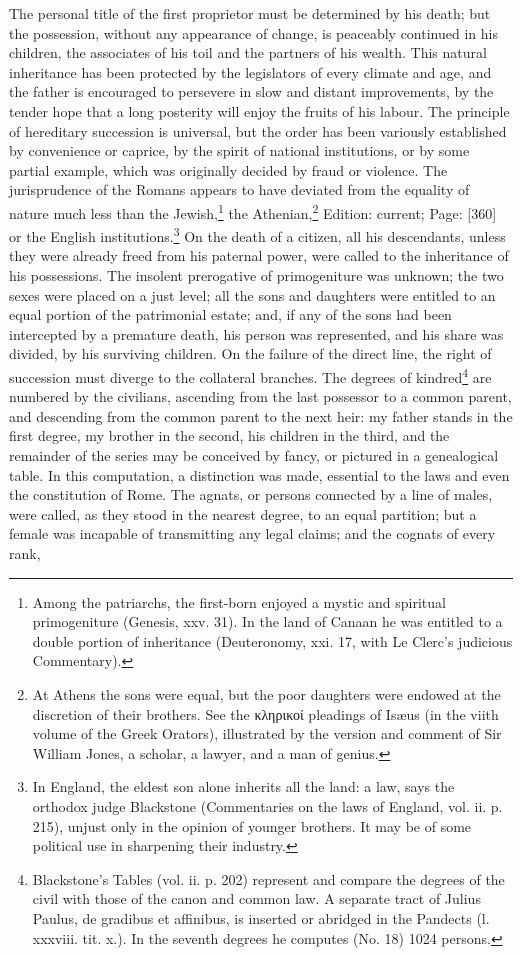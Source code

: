 The personal title of the first proprietor must be determined by his death; but the possession, without any appearance of change, is peaceably continued in his children, the associates of his toil and the partners of his wealth. This natural inheritance has been protected by the legislators of every climate and age, and the father is encouraged to persevere in slow and distant improvements, by the tender hope that a long posterity will enjoy the fruits of his labour. The principle of hereditary succession is universal, but the order has been variously established by convenience or caprice, by the spirit of national institutions, or by some partial example, which was originally decided by fraud or violence. The jurisprudence of the Romans appears to have deviated from the equality of nature much less than the Jewish,\footnote{Among the patriarchs, the first-born enjoyed a mystic and spiritual primogeniture (Genesis, xxv. 31). In the land of Canaan he was entitled to a double portion of inheritance (Deuteronomy, xxi. 17, with Le Clerc\texthebrew{}’s judicious Commentary).} the Athenian,\footnote{At Athens the sons were equal, but the poor daughters were endowed at the discretion of their brothers. See the \textgreek{κληρικοί} pleadings of Isæus (in the viith volume of the Greek Orators), illustrated by the version and comment of Sir William Jones, a scholar, a lawyer, and a man of genius.} Edition: current; Page: [360] or the English institutions.\footnote{In England, the eldest son alone inherits all the land: a law, says the orthodox judge Blackstone (Commentaries on the laws of England, vol. ii. p. 215), unjust only in the opinion of younger brothers. It may be of some political use in sharpening their industry.} On the death of a citizen, all his descendants, unless they were already freed from his paternal power, were called to the inheritance of his possessions. The insolent prerogative of primogeniture was unknown; the two sexes were placed on a just level; all the sons and daughters were entitled to an equal portion of the patrimonial estate; and, if any of the sons had been intercepted by a premature death, his person was represented, and his share was divided, by his surviving children. On the failure of the direct line, the right of succession must diverge to the collateral branches. The degrees of kindred\footnote{Blackstone\texthebrew{}’s Tables (vol. ii. p. 202) represent and compare the degrees of the civil with those of the canon and common law. A separate tract of Julius Paulus, de gradibus et affinibus, is inserted or abridged in the Pandects (l. xxxviii. tit. x.). In the seventh degrees he computes (No. 18) 1024 persons.} are numbered by the civilians, ascending from the last possessor to a common parent, and descending from the common parent to the next heir: my father stands in the first degree, my brother in the second, his children in the third, and the remainder of the series may be conceived by fancy, or pictured in a genealogical table. In this computation, a distinction was made, essential to the laws and even the constitution of Rome. The agnats, or persons connected by a line of males, were called, as they stood in the nearest degree, to an equal partition; but a female was incapable of transmitting any legal claims; and the cognats of every rank, 